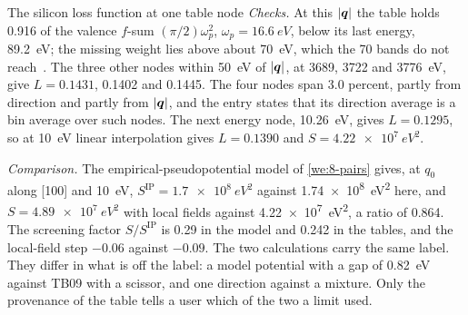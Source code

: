 \begin{workedexample}{The silicon loss function at one table node}
\emph{Checks.} At this $|\bm{q}|$ the table holds 0.916 of the valence $f$-sum $(\pi/2)\omega_p^2$, $\omega_p = \SI{16.6}{eV}$, below its last energy, \SI{89.2}{eV}; the missing weight lies above about \SI{70}{eV}, which the 70 bands do not reach~\cite[Fig.~1]{knapen2021dark}. The three other nodes within \SI{50}{eV} of $|\bm{q}|$, at 3689, 3722 and \SI{3776}{eV}, give $L = 0.1431$, 0.1402 and 0.1445. The four nodes span 3.0 percent, partly from direction and partly from $|\bm{q}|$, and the entry states that its direction average is a bin average over such nodes. The next energy node, \SI{10.26}{eV}, gives $L = 0.1295$, so at \SI{10}{eV} linear interpolation gives $L = 0.1390$ and $S = \SI{4.22e7}{eV^2}$.

\emph{Comparison.} The empirical-pseudopotential model of \cref{we:8-pairs} gives, at $q_0$ along [100] and \SI{10}{eV}, $S^{\mathrm{IP}} = \SI{1.7e8}{eV^2}$ against \SI{1.74e8}{eV^2} here, and $S = \SI{4.89e7}{eV^2}$ with local fields against \SI{4.22e7}{eV^2}, a ratio of 0.864. The screening factor $S/S^{\mathrm{IP}}$ is 0.29 in the model and 0.242 in the tables, and the local-field step $-0.06$ against $-0.09$. The two calculations carry the same label. They differ in what is off the label: a model potential with a gap of \SI{0.82}{eV} against TB09 with a scissor, and one direction against a mixture. Only the provenance of the table tells a user which of the two a limit used.
\end{workedexample}
